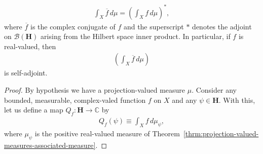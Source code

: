 \begin{theorem}
\begin{enumerate}
            \begin{align}
                \int_X \overline{f} \, d\mu = \left( \int_X f \, d\mu \right)^*,
            \end{align}
            where $\overline{f}$ is the complex conjugate of $f$ and the superscript $*$ denotes the adjoint on $\mathcal{B}(\mathbf{H})$ arising from the Hilbert space inner product. In particular, if $f$ is real-valued, then
            \begin{align}
                \left( \int_X \overline{f} \, d\mu \right)
            \end{align}
            is self-adjoint.
    \end{enumerate}
\end{theorem}

\begin{proof}
    By hypothesis we have a projection-valued measure $\mu$. Consider any bounded, measurable, complex-valed function $f$ on $X$ and any $\psi \in \mathbf{H}$. With this, let us define a map $Q_f : \mathbf{H} \rightarrow \mathbb{C}$ by
    \begin{align}
        Q_f(\psi) \equiv \int_X f \, d\mu_\psi,
    \end{align}
    where $\mu_\psi$ is the positive real-valued measure of Theorem~\ref{thrm:projection-valued-measures-associated-measure}.


\end{proof}
